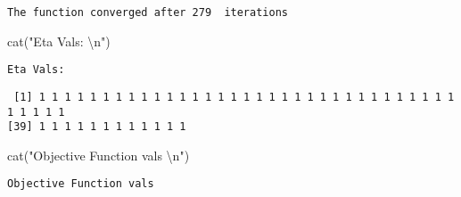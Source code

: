 \documentclass[
  letterpaper,
  DIV=11,
  numbers=noendperiod]{scrartcl}
\newenvironment{Shaded}{\begin{snugshade}}{\end{snugshade}}
\newcommand{\DecValTok}[1]{\textcolor[rgb]{0.68,0.00,0.00}{#1}}
\newcommand{\FunctionTok}[1]{\textcolor[rgb]{0.28,0.35,0.67}{#1}}
\newcommand{\NormalTok}[1]{\textcolor[rgb]{0.00,0.23,0.31}{#1}}
\newcommand{\SpecialCharTok}[1]{\textcolor[rgb]{0.37,0.37,0.37}{#1}}
\newcommand{\StringTok}[1]{\textcolor[rgb]{0.13,0.47,0.30}{#1}}
\begin{document}
\begin{Shaded}
\end{Shaded}

\begin{verbatim}
The function converged after 279  iterations 
\end{verbatim}

\begin{Shaded}
\begin{Highlighting}[]
\FunctionTok{cat}\NormalTok{(}\StringTok{"Eta Vals: }\SpecialCharTok{\textbackslash{}n}\StringTok{"}\NormalTok{)}
\end{Highlighting}
\end{Shaded}

\begin{verbatim}
Eta Vals: 
\end{verbatim}

\begin{Shaded}
\end{Shaded}

\begin{verbatim}
 [1] 1 1 1 1 1 1 1 1 1 1 1 1 1 1 1 1 1 1 1 1 1 1 1 1 1 1 1 1 1 1 1 1 1 1 1 1 1 1
[39] 1 1 1 1 1 1 1 1 1 1 1 1
\end{verbatim}

\begin{Shaded}
\begin{Highlighting}[]
\FunctionTok{cat}\NormalTok{(}\StringTok{"Objective Function vals }\SpecialCharTok{\textbackslash{}n}\StringTok{"}\NormalTok{)}
\end{Highlighting}
\end{Shaded}

\begin{verbatim}
Objective Function vals 
\end{verbatim}

\begin{Shaded}
\end{Shaded}
\end{document}
